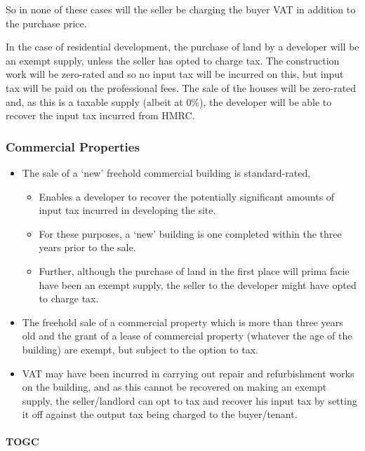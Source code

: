 \documentclass[
]{article}
\providecommand{\tightlist}{%
  \setlength{\itemsep}{0pt}\setlength{\parskip}{0pt}}
\begin{document}
So in none of these cases will the seller be charging the buyer VAT in
addition to the purchase price.

In the case of residential development, the purchase of land by a
developer will be an exempt supply, unless the seller has opted to
charge tax. The construction work will be zero-rated and so no input tax
will be incurred on this, but input tax will be paid on the professional
fees. The sale of the houses will be zero-rated and, as this is a
taxable supply (albeit at 0\%), the developer will be able to recover
the input tax incurred from HMRC.

\hypertarget{commercial-properties}{%
\subsubsection{Commercial Properties}\label{commercial-properties}}

\begin{itemize}
\tightlist
\item
  The sale of a `new' freehold commercial building is standard-rated,

  \begin{itemize}
  \tightlist
  \item
    Enables a developer to recover the potentially significant amounts
    of input tax incurred in developing the site.
  \item
    For these purposes, a `new' building is one completed within the
    three years prior to the sale.
  \item
    Further, although the purchase of land in the first place will prima
    facie have been an exempt supply, the seller to the developer might
    have opted to charge tax.
  \end{itemize}
\item
  The freehold sale of a commercial property which is more than three
  years old and the grant of a lease of commercial property (whatever
  the age of the building) are exempt, but subject to the option to tax.
\item
  VAT may have been incurred in carrying out repair and refurbishment
  works on the building, and as this cannot be recovered on making an
  exempt supply, the seller/landlord can opt to tax and recover his
  input tax by setting it off against the output tax being charged to
  the buyer/tenant.
\end{itemize}

\hypertarget{togc}{%
\paragraph{TOGC}\label{togc}}
\end{document}
